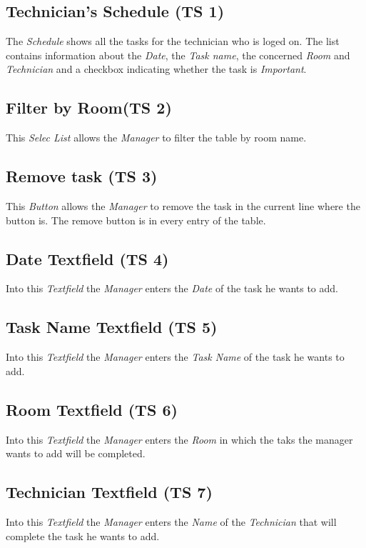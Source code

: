 \subsection{Technician's Schedule (TS 1)}
The \emph{Schedule} shows all the tasks for the technician who is loged on. The
list contains information about the \emph{Date}, the \emph{Task name}, the
concerned \emph{Room} and \emph{Technician} and a checkbox indicating whether
the task is \emph{Important}.

\subsection{Filter by Room(TS 2)}
This \emph{Selec List} allows the \emph{Manager} to filter the table by room
name.

\subsection{Remove task (TS 3)}
This \emph{Button} allows the \emph{Manager} to remove the task in the current
line where the button is. The remove button is in every entry of the table.

\subsection{Date Textfield (TS 4)}
Into this \emph{Textfield} the \emph{Manager} enters the \emph{Date} of the task
he wants to add.

\subsection{Task Name Textfield (TS 5)}
Into this \emph{Textfield} the \emph{Manager} enters the \emph{Task Name} of the
task he wants to add.

\subsection{Room Textfield (TS 6)}
Into this \emph{Textfield} the \emph{Manager} enters the \emph{Room} in which
the taks the manager wants to add will be completed.

\subsection{Technician Textfield (TS 7)}
Into this \emph{Textfield} the \emph{Manager} enters the \emph{Name} of the
\emph{Technician} that will complete the task he wants to add.


